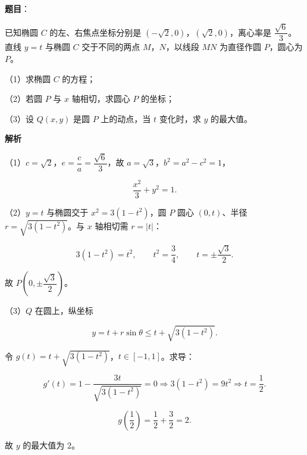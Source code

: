 \begin{answer}

\textbf{题目}：

已知椭圆 $C$ 的左、右焦点坐标分别是 $(-\sqrt2,0)$，$(\sqrt2,0)$，离心率是 $\dfrac{\sqrt6}3$。直线 $y=t$ 与椭圆 $C$ 交于不同的两点 $M$，$N$，以线段 $MN$ 为直径作圆 $P$，圆心为 $P$。

（1）求椭圆 $C$ 的方程；

（2）若圆 $P$ 与 $x$ 轴相切，求圆心 $P$ 的坐标；

（3）设 $Q(x,y)$ 是圆 $P$ 上的动点，当 $t$ 变化时，求 $y$ 的最大值。

\textbf{解析}

（1）$c=\sqrt2$，$e=\dfrac ca=\dfrac{\sqrt6}3$，故 $a=\sqrt3$，$b^2=a^2-c^2=1$，

\nopagebreak[4]
\[\frac{x^2}3+y^2=1.\]

（2）$y=t$ 与椭圆交于 $x^2=3(1-t^2)$，圆 $P$ 圆心 $(0,t)$、半径 $r=\sqrt{3(1-t^2)}$。与 $x$ 轴相切需 $r=|t|$：

\nopagebreak[4]
\[3(1-t^2)=t^2,\qquad t^2=\frac34,\qquad t=\pm\frac{\sqrt3}2.\]

故 $P\left(0,\pm\dfrac{\sqrt3}2\right)$。

（3）$Q$ 在圆上，纵坐标

\nopagebreak[4]
\[y=t+r\sin\theta\leqslant t+\sqrt{3(1-t^2)}.\]

令 $g(t)=t+\sqrt{3(1-t^2)}$，$t\in[-1,1]$。求导：

\nopagebreak[4]
\[g'(t)=1-\frac{3t}{\sqrt{3(1-t^2)}}=0
\Longrightarrow 3(1-t^2)=9t^2
\Longrightarrow t=\frac12.\]

\nopagebreak[4]
\[g\left(\frac12\right)=\frac12+\frac32=2.\]

故 $y$ 的最大值为 $2$。


\end{answer}
